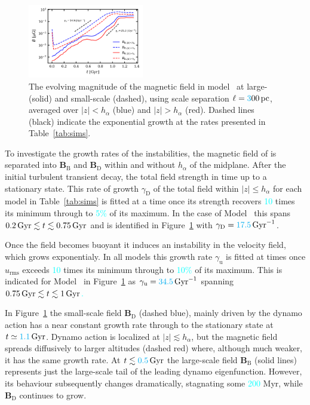 \documentclass[fleqn,usenatbib]{mnras}
\newcommand{\RSOBSD}{{\sf{O60q0.3}}}
\newcommand{\fg}[1]{\textcolor{cyan}{#1}} %
\renewcommand\vec[1]{\bm{#1}}%
\newcommand{\BB}{\vec{B}} %
\newcommand{\p}{\,{\rm pc}}     %
\newcommand{\Gyr}{\,{\rm Gyr}}  %
\begin{document}
\begin{figure}
    \centering
    \includegraphics[width=0.45\textwidth]{Mag_in_out.png}
    \caption{The evolving magnitude of the magnetic field in model \RSOBSD\ at
large-(solid) and small-scale (dashed), using scale separation
$\ell=\fg{3}00\p$, averaged over $\lvert z \rvert < h_{\alpha}$ (blue) and
$\lvert z \rvert > h_{\alpha}$ (red).  Dashed lines (black) indicate the
exponential growth at the rates presented in Table~\ref{tab:sims}.
    }
    \label{fig:ts_mag}
\end{figure}

To {investigate} the growth {rates of the instabilities,} the magnetic
field of is separated into $\BB_\text{B}$ and $\BB_\text{D}$ within and without
$h_\alpha$ of the midplane.  After the initial {turbulent transient decay,
the total} field strength {in time up to} a stationary state.  {This rate
of growth $\gamma_\text{D}$ of the total field within $|z|\leq h_\alpha$ for
each model in Table~\ref{tab:sims} is fitted at a time once its strength
recovers \fg{10} times its minimum through to \fg{5\%} of its maximum.  In the case of
Model \RSOBSD\ this spans \fg{$0.2\Gyr\lesssim t \lesssim0.75\Gyr$} and is
identified in Figure~\ref{fig:ts_mag} with $\gamma_\text{D}=\fg{17.5}\Gyr^{-1}$.}

{Once the field becomes buoyant it induces an instability in the velocity
field, which grows exponentialy. In all models this growth rate
$\gamma_\text{u}$ is fitted at times once $u_\text{rms}$ exceeds \fg{10} times its
minimum through to \fg{10\%} of its maximum. This is indicated for Model \RSOBSD\ in
Figure~\ref{fig:ts_mag} as $\gamma_\text{u}=\fg{34.5}\Gyr^{-1}$ spanning
\fg{$0.75\Gyr\lesssim t \lesssim 1\Gyr$.}}

{In Figure~\ref{fig:ts_mag}} the small{-scale field} $\BB_\text{D}$
(dashed blue), {mainly driven} by the dynamo action {has a near constant
growth rate through to} the stationary state at $t\simeq\fg{1.1}\Gyr$. Dynamo action
is localized at {$|z|\lesssim h_\alpha$}, but the magnetic field spreads
diffusively to larger altitudes (dashed red) where, although much weaker,
{it has} the same {growth} rate.  {At $t\lesssim\fg{0.5}\Gyr$ the
large-scale field} $\BB_\text{B}$ (solid lines) represents just the large-scale
tail of the leading dynamo eigenfunction.  {However, its behaviour
subsequently changes dramatically, stagnating some \fg{200} Myr, while
$\BB_\text{D}$ continues to grow.}
\end{document}
